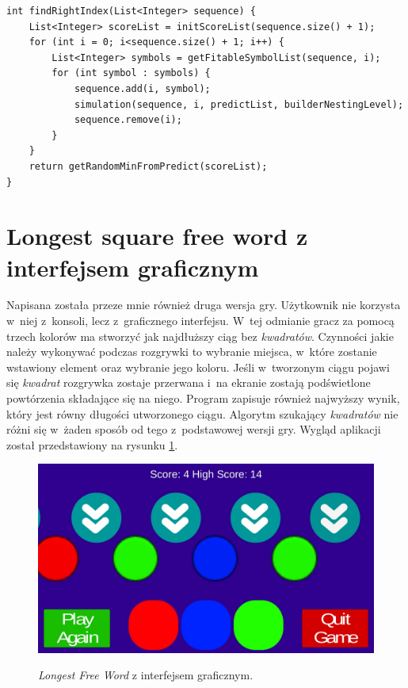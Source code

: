 \documentclass[document]{xmgr}
\begin{document}
\begin{lstlisting}[caption={Metoda szukająca pozycji, wykorzystująca rekurencję.},label=lst:findRightIndex]
int findRightIndex(List<Integer> sequence) {
	List<Integer> scoreList = initScoreList(sequence.size() + 1);
	for (int i = 0; i<sequence.size() + 1; i++) {
		List<Integer> symbols = getFitableSymbolList(sequence, i);
		for (int symbol : symbols) {
			sequence.add(i, symbol);
			simulation(sequence, i, predictList, builderNestingLevel);
			sequence.remove(i);
		}
	}
	return getRandomMinFromPredict(scoreList);
}
\end{lstlisting}

\section{Longest square free word z interfejsem graficznym}
Napisana została przeze mnie również druga wersja gry. Użytkownik nie korzysta w~niej z~konsoli, lecz z~graficznego interfejsu. W~tej odmianie gracz za pomocą trzech kolorów ma stworzyć jak najdłuższy ciąg bez \emph{kwadratów}. Czynności jakie należy wykonywać podczas rozgrywki to wybranie miejsca, w~które zostanie wstawiony element oraz wybranie jego koloru. Jeśli w~tworzonym ciągu pojawi się \emph{kwadrat} rozgrywka zostaje przerwana i~na ekranie zostają podświetlone powtórzenia składające się na niego. Program zapisuje również najwyższy wynik, który jest równy długości utworzonego ciągu. Algorytm szukający \emph{kwadratów} nie różni się w~żaden sposób od tego z~podstawowej wersji gry. Wygląd aplikacji został przedstawiony na rysunku \ref{fig:thueMobile}.

\begin{figure}[tbh]
    \centering
    \caption{\emph{Longest Free Word} z interfejsem graficznym.}
    \includegraphics[width = \textwidth]{images/thueMobile}
    \label{fig:thueMobile}
\end{figure}
\end{document}
